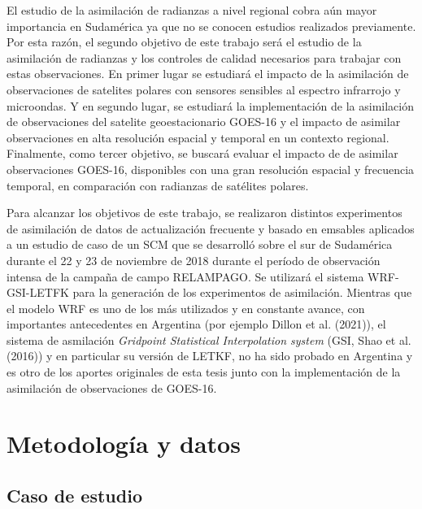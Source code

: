 \documentclass[12pt,oneside,a4paper]{reedthesis}
\begin{document}
El estudio de la asimilación de radianzas a nivel regional cobra aún mayor importancia en Sudamérica ya que no se conocen estudios realizados previamente. Por esta razón, el segundo objetivo de este trabajo será el estudio de la asimilación de radianzas y los controles de calidad necesarios para trabajar con estas observaciones. En primer lugar se estudiará el impacto de la asimilación de observaciones de satelites polares con sensores sensibles al espectro infrarrojo y microondas. Y en segundo lugar, se estudiará la implementación de la asimilación de observaciones del satelite geoestacionario GOES-16 y el impacto de asimilar observaciones en alta resolución espacial y temporal en un contexto regional. Finalmente, como tercer objetivo, se buscará evaluar el impacto de de asimilar observaciones GOES-16, disponibles con una gran resolución espacial y frecuencia temporal, en comparación con radianzas de satélites polares.

Para alcanzar los objetivos de este trabajo, se realizaron distintos experimentos de asimilación de datos de actualización frecuente y basado en emsables aplicados a un estudio de caso de un SCM que se desarrolló sobre el sur de Sudamérica durante el 22 y 23 de noviembre de 2018 durante el período de observación intensa de la campaña de campo RELAMPAGO. Se utilizará el sistema WRF-GSI-LETFK para la generación de los experimentos de asimilación. Mientras que el modelo WRF es uno de los más utilizados y en constante avance, con importantes antecedentes en Argentina (por ejemplo Dillon et al. (2021)), el sistema de asmilación \emph{Gridpoint Statistical Interpolation system} (GSI, Shao et al. (2016)) y en particular su versión de LETKF, no ha sido probado en Argentina y es otro de los aportes originales de esta tesis junto con la implementación de la asimilación de observaciones de GOES-16.

\hypertarget{metodologuxeda-y-datos}{%
\chapter{Metodología y datos}\label{metodologuxeda-y-datos}}

\hypertarget{caso-de-estudio}{%
\section{Caso de estudio}\label{caso-de-estudio}}
\end{document}
